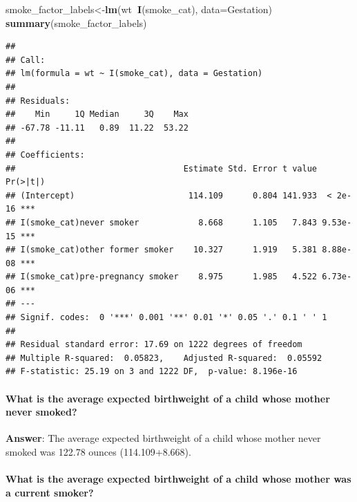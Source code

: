 \documentclass[]{article}
\newenvironment{Shaded}{\begin{snugshade}}{\end{snugshade}}
\newcommand{\DataTypeTok}[1]{\textcolor[rgb]{0.13,0.29,0.53}{#1}}
\newcommand{\KeywordTok}[1]{\textcolor[rgb]{0.13,0.29,0.53}{\textbf{#1}}}
\newcommand{\NormalTok}[1]{#1}
\newcommand{\OperatorTok}[1]{\textcolor[rgb]{0.81,0.36,0.00}{\textbf{#1}}}
\let\oldparagraph\paragraph
\renewcommand{\paragraph}[1]{\oldparagraph{#1}\mbox{}}
\begin{document}
\begin{Shaded}
\begin{Highlighting}[]
\NormalTok{smoke_factor_labels<-}\KeywordTok{lm}\NormalTok{(wt}\OperatorTok{~}\KeywordTok{I}\NormalTok{(smoke_cat), }\DataTypeTok{data=}\NormalTok{Gestation)}
\KeywordTok{summary}\NormalTok{(smoke_factor_labels)}
\end{Highlighting}
\end{Shaded}

\begin{verbatim}
## 
## Call:
## lm(formula = wt ~ I(smoke_cat), data = Gestation)
## 
## Residuals:
##    Min     1Q Median     3Q    Max 
## -67.78 -11.11   0.89  11.22  53.22 
## 
## Coefficients:
##                                  Estimate Std. Error t value Pr(>|t|)    
## (Intercept)                       114.109      0.804 141.933  < 2e-16 ***
## I(smoke_cat)never smoker            8.668      1.105   7.843 9.53e-15 ***
## I(smoke_cat)other former smoker    10.327      1.919   5.381 8.88e-08 ***
## I(smoke_cat)pre-pregnancy smoker    8.975      1.985   4.522 6.73e-06 ***
## ---
## Signif. codes:  0 '***' 0.001 '**' 0.01 '*' 0.05 '.' 0.1 ' ' 1
## 
## Residual standard error: 17.69 on 1222 degrees of freedom
## Multiple R-squared:  0.05823,    Adjusted R-squared:  0.05592 
## F-statistic: 25.19 on 3 and 1222 DF,  p-value: 8.196e-16
\end{verbatim}

\hypertarget{what-is-the-average-expected-birthweight-of-a-child-whose-mother-never-smoked-1}{%
\paragraph{What is the average expected birthweight of a child whose
mother never
smoked?}\label{what-is-the-average-expected-birthweight-of-a-child-whose-mother-never-smoked-1}}

\textbf{Answer}: The average expected birthweight of a child whose
mother never smoked was 122.78 ounces (114.109+8.668).

\hypertarget{what-is-the-average-expected-birthweight-of-a-child-whose-mother-was-a-current-smoker}{%
\paragraph{What is the average expected birthweight of a child whose
mother was a current
smoker?}\label{what-is-the-average-expected-birthweight-of-a-child-whose-mother-was-a-current-smoker}}
\end{document}
